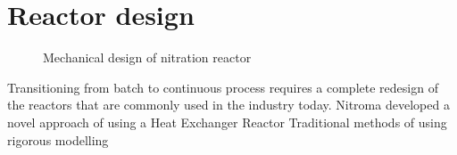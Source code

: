 \section*{Reactor design}
\begin{figure}[h]
    \centering
    \caption{Mechanical design of nitration reactor}
    \label{fig:comsol-S4-CW-X-T}
\end{figure}

Transitioning from batch to continuous process requires a complete redesign of the reactors that are commonly used in the industry today. Nitroma developed a novel approach of using a Heat Exchanger Reactor
Traditional methods of using 
rigorous modelling

